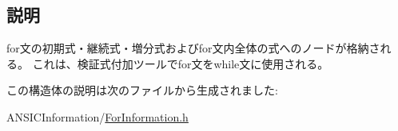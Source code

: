 \subsection{説明}
for文の初期式・継続式・増分式およびfor文内全体の式へのノードが格納される。 これは、検証式付加ツールでfor文をwhile文に使用される。 

この構造体の説明は次のファイルから生成されました:\begin{DoxyCompactItemize}
\item 
ANSICInformation/\hyperlink{ForInformation_8h}{ForInformation.h}\end{DoxyCompactItemize}
